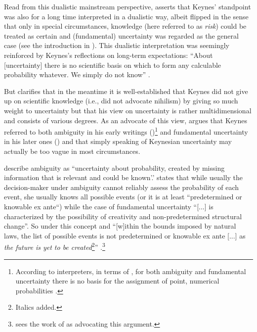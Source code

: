 \documentclass[a4paper,11pt,listof=nochaptergap,oneside,pointednumbers,bibtotoc,bigheadings,liststotoc,hidelinks]{scrbook}
\theoremstyle{mysatz}
\theoremstyle{mydefinition}
\theoremstyle{mytheorem}
\theoremstyle{mybemerkung}
\begin{document}
Read from this dualistic mainstream perspective, \citet{dow:16} asserts that Keynes' standpoint was also for a long time interpreted in a dualistic way, albeit flipped in the sense that only in special circumstances, knowledge (here referred to as \textit{risk}) could be treated as certain and (fundamental) uncertainty was regarded as the general case (see the introduction in \citealp{keynes:21}). This dualistic interpretation was seemingly reinforced by Keynes's reflections on long-term expectations: ``About [uncertainty] there is no scientific basis on which to form any calculable probability whatever. We simply do not know'' \citep[p. 214]{keynes:37}.

But \citet{dow:16} clarifies that in the meantime it is well-established that Keynes did not give up on scientific knowledge (i.e., did not advocate nihilism) by giving so much weight to uncertainty but that his view on uncertainty is rather multidimensional and consists of various degrees. As an advocate of this view, \citet{dequesh:00} argues that Keynes referred to both ambiguity in his early writings (\citealp{keynes:21})\footnote{According to interpreters, in terms of \citet{keynes:21}, for both ambiguity and fundamental uncertainty there is no basis for the assignment of point, numerical probabilities \citep{dequesh:00}.} and fundamental uncertainty in his later ones (\citealp{keynes:37}) and that simply speaking of Keynesian uncertainty may actually be too vague in most circumstances.

\citet[p. 330]{camererandweber:92} describe ambiguity as ``uncertainty about probability, created by missing information that is relevant and could be known'.' \citet[p. 623]{dequech:14} states that while usually the decision-maker under ambiguity cannot reliably assess the probability of each event, she usually knows all possible events (or it is at least ``predetermined or knowable ex ante``) while the case of fundamental uncertainty ``[...] is characterized by the possibility of creativity and non-predetermined structural change''. So under this concept and ``[w]ithin the bounds imposed by natural laws, the list of possible events is not predetermined or knowable ex ante [...] as \textit{the future is yet to be created}\footnote{Italics added.}'' \citep[p. 623]{dequech:14}.\footnote{\citet{dequesh:00} sees the work of \citet{shackle:72} as advocating this argument.}
\end{document}
